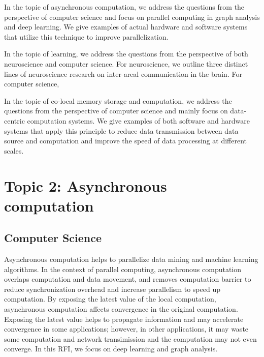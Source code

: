\documentclass[12pt]{report}
\begin{document}
In the topic of asynchronous computation, we address the questions from
the perspective of computer science and focus on parallel computing in graph
analysis and deep learning. We give examples of actual hardware and software
systems that utilize this technique to improve parallelization.

In the topic of learning, we address the questions from the perspective of
both neuroscience and computer science. For neuroscience, we outline three
distinct lines of neuroscience research on inter-areal communication in the brain.
For computer science, 

In the topic of co-local memory storage and computation, we address
the questions from the perspective of computer science and mainly focus on
data-centric computation systems. We give examples of both software and
hardware systems that apply this principle to reduce data transmission between
data source and computation and improve the speed of data processing at
different scales.

\newpage

\section*{Topic 2: Asynchronous computation}

\subsection{Computer Science}

Asynchronous computation helps to parallelize data mining and machine learning
algorithms. In the context of parallel computing, asynchronous computation
overlaps computation and data movement, and removes computation barrier to
reduce synchronization
overhead and increase parallelism to speed up computation. By exposing
the latest value of the local computation, asynchronous computation affects
convergence in the original computation. Exposing the latest value helps to
propagate information and may accelerate convergence in some applications;
however, in other applications, it may waste some computation and network
transimission and the computation may not even converge. In this RFI, we
focus on deep learning and graph analysis.
\end{document}
